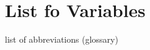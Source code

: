 \documentclass[
thesis.tex
]{subfiles}
\begin{document}
	\newpage

	
	\section*{List fo Variables}
	
	
	
	\thispagestyle{empty}
	
	\newpage


	list of abbreviations (glossary)

	\thispagestyle{empty}
	
	\newpage


	\listoffigures
	
	\thispagestyle{empty}
	
	\newpage


	\listoftables
	
	\thispagestyle{empty}
\end{document}
